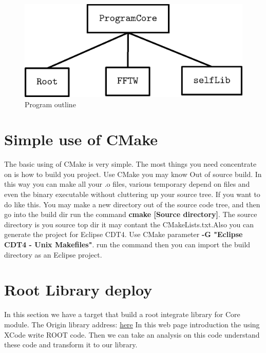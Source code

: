 \documentclass[fleqn,10pt]{SelfArx} %
\begin{document}
\begin{CJK*}{UTF8}{gbsn}
\begin{figure}[ht]\centering %
\includegraphics[width=\linewidth]{figures/figure1.eps}
\caption{Program outline}
\label{fig:Outline}
\end{figure}

\section{Simple use of CMake}

The basic using of CMake is very simple. The most things you need concentrate on is how to build you project.
Use CMake you may know Out of source build. In this way you can make all your .o files, various temporary depend on files
and even the binary executable without cluttering up your source tree. %
If you want to do like this. You may make a new directory out of the source code tree, and then go into the build dir run the command \textbf{cmake [Source directory]}.
The source directory is you source top dir it may contant the CMakeLists.txt.Also you can generate the project for Eclipse CDT4.
Use CMake parameter \textbf{-G "Eclipse CDT4 - Unix Makefiles"}. run the command then you can import the build directory as an Eclipse project.

\section{Root Library deploy}

In this section we have a target that build a root integrate library for Core module.
The Origin library address: \href{http://root.cern.ch/drupal/content/can-i-integrate-root-my-cmake-build}{here}
In this web page introduction the using XCode write ROOT code.
Then we can take an analysis on this code understand these code and transform it to our library.


\end{CJK*}
\end{document}
